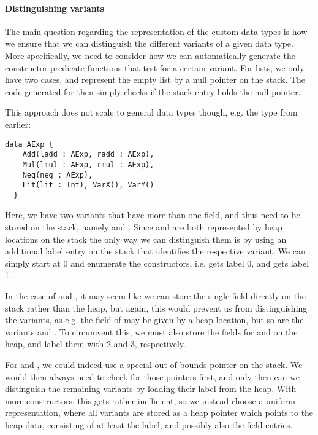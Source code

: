 \paragraph{Distinguishing variants}
The main question regarding the representation of the custom data types is how
we ensure that we can distinguish the different variants of a given data type.
More specifically, we need to consider how we can automatically generate the
constructor predicate functions that test for a certain variant.
For lists, we only have two cases, and represent the empty list by a null
pointer on the stack. The code generated for  then simply checks
if the stack entry holds the null pointer.

This approach does not scale to general data types though, e.g. the 
type from earlier:
%
\begin{lstlisting}[language=SPL]
  data AExp {
    Add(ladd : AExp, radd : AExp),
    Mul(lmul : AExp, rmul : AExp),
    Neg(neg : AExp),
    Lit(lit : Int), VarX(), VarY()
  }
\end{lstlisting}
%
Here, we have two variants that have more than one field, and thus need to be
stored on the stack, namely  and .
Since  and  are both represented by heap locations on the
stack the only way we can distinguish them is by using an additional label entry
on the stack that identifies the respective variant.
We can simply start at 0 and enumerate the constructors, i.e.  gets
label 0, and  gets label 1.

In the case of  and , it may seem like we can store the single
field directly on the stack rather than the heap, but again, this would prevent
us from distinguishing the variants, as e.g. the field of  may be given
by a heap location, but so are the variants  and . To
circumvent this, we must also store the fields for  and  on
the heap, and label them with 2 and 3, respectively.

For  and , we could indeed use a special out-of-bounds
pointer on the stack. We would then always need to check for those pointers
first, and only then can we distinguish the remaining variants by loading their
label from the heap.
With more constructors, this gets rather inefficient, so we instead choose a
uniform representation, where all variants are stored as a heap pointer which
points to the heap data, consisting of at least the label, and possibly also the
field entries.

